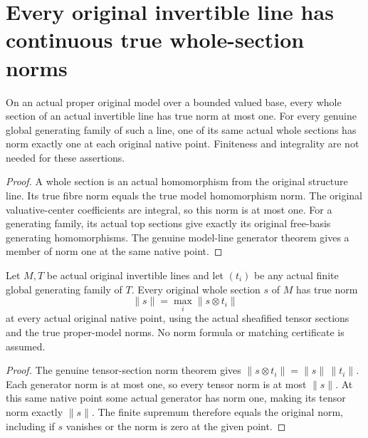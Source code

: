 \section{Every original invertible line has continuous true whole-section norms}
\label{sec:scheme-global-section-norm-continuity}

\begin{lemma}
\label{lem:scheme-original-global-generator-norms}
\leanok
{}
On an actual proper original model over a bounded valued base, every
whole section of an actual invertible line has true norm at most one.
For every genuine global generating family of such a line, one of its
same actual whole sections has norm exactly one at each original native
point. Finiteness and integrality are not needed for these assertions.
\end{lemma}
\begin{proof}
A whole section is an actual homomorphism from the original structure
line. Its true fibre norm equals the true model homomorphism norm. The
original valuative-center coefficients are integral, so this norm is at
most one. For a generating family, its actual top sections give exactly
its original free-basis generating homomorphisms. The genuine model-line
generator theorem gives a member of norm one at the same native point.
\end{proof}

\begin{theorem}
\label{thm:scheme-original-section-tensor-generator-norm}
\leanok
{}
Let $M,T$ be actual original invertible lines and let $(t_i)$ be any
actual finite global generating family of $T$. Every original whole
section $s$ of $M$ has true norm
\[
 \|s\|=\max_i\|s\otimes t_i\|
\]
at every actual original native point, using the actual sheafified tensor
sections and the true proper-model norms. No norm formula or matching
certificate is assumed.
\end{theorem}
\begin{proof}
The genuine tensor-section norm theorem gives
$\|s\otimes t_i\|=\|s\|\,\|t_i\|$. Each generator norm is at most one,
so every tensor norm is at most $\|s\|$. At this same native point some
actual generator has norm one, making its tensor norm exactly $\|s\|$.
The finite supremum therefore equals the original norm, including if
$s$ vanishes or the norm is zero at the given point.
\end{proof}

